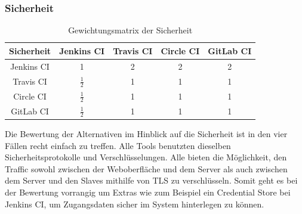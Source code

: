 \subsubsection{Sicherheit}
\begin{table}[h!]
	\centering
	\begin{tabular}{c|cccc}
		Sicherheit   & Jenkins CI		 & Travis CI& Circle CI & GitLab CI   \\ 
		\hline
		Jenkins CI      & 1     		      &        2       &      2     &     2      \\
		Travis CI &   $\frac{1}{2}$  & 1               &       1      &      1      \\
		Circle CI   &   $\frac{1}{2}$    &  1  & 1            &       1      \\
		GitLab CI    &    $\frac{1}{2}$    &  1   &        1      & 1           \\
	\end{tabular}
	\caption{Gewichtungsmatrix der Sicherheit}
	\label{safe}
\end{table}
Die Bewertung der Alternativen im Hinblick auf die Sicherheit ist in den vier Fällen recht einfach zu treffen. Alle Tools benutzten dieselben Sicherheitsprotokolle und Verschlüsselungen. Alle bieten die Möglichkeit, den Traffic sowohl zwischen der Weboberfläche und dem Server als auch zwischen dem Server und den Slaves mithilfe von TLS zu verschlüsseln. Somit geht es bei der Bewertung vorrangig um Extras wie zum Beispiel ein Credential Store bei Jenkins CI, um Zugangsdaten sicher im System hinterlegen zu können.
